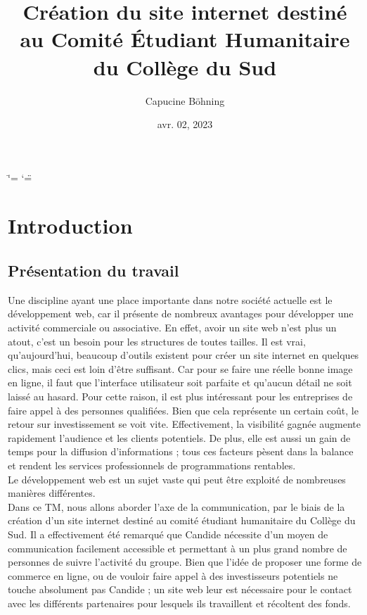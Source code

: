 \documentclass[a4,10pt,french]{sphinxmanual}
\title{Création du site internet destiné au Comité Étudiant Humanitaire du Collège du Sud}
\date{avr. 02, 2023}
\author{Capucine Böhning}
\begin{document}
\ifdefined\shorthandoff
  \ifnum\catcode`\=\string=\active\shorthandoff{=}\fi
  \ifnum\catcode`\"=\active{}\fi
\fi

\pagestyle{empty}
\sphinxmaketitle
\pagestyle{plain}
\sphinxtableofcontents
\pagestyle{normal}
\label{\detokenize{index::doc}}



\chapter{Introduction}
\label{\detokenize{introduction:introduction}}\label{\detokenize{introduction::doc}}

\section{Présentation du travail}
\label{\detokenize{introduction:presentation-du-travail}}
\sphinxAtStartPar
Une discipline ayant une place importante dans notre société actuelle est le développement web, car il présente de nombreux avantages pour développer une activité commerciale ou associative. En effet, avoir un site web n’est plus un atout, c’est un besoin pour les structures de toutes tailles. Il est vrai, qu’aujourd’hui, beaucoup d’outils existent pour créer un site internet en quelques clics, mais ceci est loin d’être suffisant. Car pour se faire une réelle bonne image en ligne, il faut que l’interface utilisateur soit parfaite et qu’aucun détail ne soit laissé au hasard. Pour cette raison, il est plus intéressant pour les entreprises de faire appel à des personnes qualifiées. Bien que cela représente un certain coût, le retour sur investissement se voit vite. Effectivement, la visibilité gagnée augmente rapidement l’audience et les clients potentiels. De plus, elle est aussi un gain de temps pour la diffusion d’informations ; tous ces facteurs pèsent dans la balance et rendent les services professionnels de programmations rentables.\\
Le développement web est un sujet vaste qui peut être exploité de nombreuses manières différentes.\\
Dans ce TM, nous allons aborder l’axe de la communication, par le biais de la création d’un site internet destiné au comité étudiant humanitaire du Collège du Sud. Il a effectivement été remarqué que Candide nécessite d’un moyen de communication facilement accessible et permettant à un plus grand nombre de personnes de suivre l’activité du groupe. Bien que l’idée de proposer une forme de commerce en ligne, ou de vouloir faire appel à des investisseurs potentiels ne touche absolument pas Candide ; un site web leur est nécessaire pour le contact avec les différents partenaires pour lesquels ils travaillent et récoltent des fonds.\\
\end{document}
